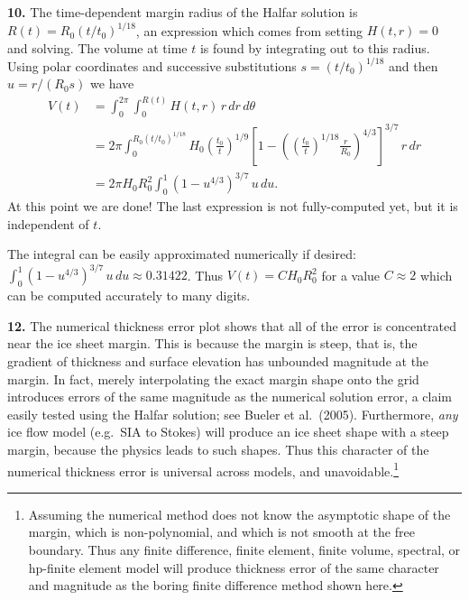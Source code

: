 \documentclass[10pt]{amsart}
\newcommand{\prob}[1]{\bigskip\noindent\large\textbf{#1.}\normalsize }
\begin{document}
\prob{10}  The time-dependent margin radius of the Halfar solution is $R(t) = R_0 (t/t_0)^{1/18}$, an expression which comes from setting $H(t,r)=0$ and solving.  The volume at time $t$ is found by integrating out to this radius.  Using polar coordinates and successive substitutions $s = (t/t_0)^{1/18}$ and then $u=r/(R_0 s)$ we have
\begin{align*}
V(t) &= \int_0^{2\pi} \int_0^{R(t)} H(t,r) \,r\,dr\,d\theta \\
     &= 2\pi \int_0^{R_0 (t/t_0)^{1/18}} H_0 \left(\frac{t_0}{t}\right)^{1/9} \left[1 - \left(\left(\frac{t_0}{t}\right)^{1/18} \frac{r}{R_0}\right)^{4/3}\right]^{3/7} \,r\,dr \\
     &= 2\pi H_0 R_0^2 \int_0^1 \left(1 - u^{4/3}\right)^{3/7} \,u\,du.
\end{align*}
At this point we are done!  The last expression is not fully-computed yet,  but it is independent of $t$.

The integral can be easily approximated numerically if desired: $\int_0^1 (1 - u^{4/3})^{3/7} \,u\,du \approx 0.31422$.  Thus $V(t) = C H_0 R_0^2$ for a value $C\approx 2$ which can be computed accurately to many digits.

\prob{12}  The numerical thickness error plot shows that all of the error is concentrated near the ice sheet margin.  This is because the margin is steep, that is, the gradient of thickness and surface elevation has unbounded magnitude at the margin.  In fact, merely interpolating the exact margin shape onto the grid introduces errors of the same magnitude as the numerical solution error, a claim easily tested using the Halfar solution; see Bueler et al.~(2005).  Furthermore, \emph{any} ice flow model (e.g.~SIA to Stokes) will produce an ice sheet shape with a steep margin, because the physics leads to such shapes.  Thus this character of the numerical thickness error is universal across models, and unavoidable.\footnote{Assuming the numerical method does not know the asymptotic shape of the margin, which is non-polynomial, and which is not smooth at the free boundary.  Thus any finite difference, finite element, finite volume, spectral, or hp-finite element model will produce thickness error of the same character and magnitude as the boring finite difference method shown here.}
\end{document}
